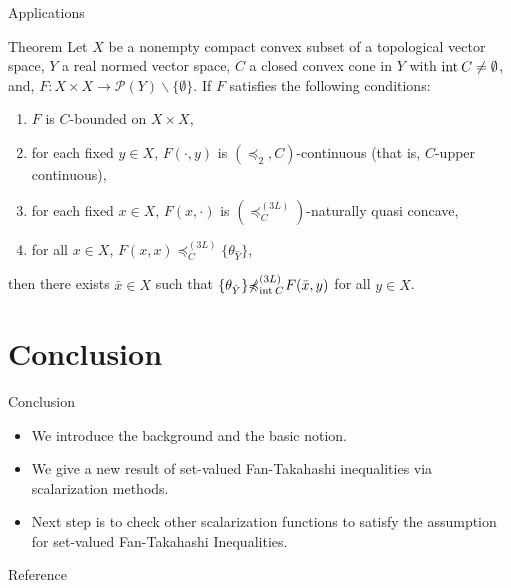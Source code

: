 \documentclass[aspectratio=169, dvipdfmx, 11pt]{beamer}
\newcommand{\Interior}[1]{\text{\rm int\:${#1}$}} %
\newcommand{\notsetrel}[2]{{\not\preccurlyeq}^{(#1)}_{#2}\!}
\begin{document}
\begin{frame}{Applications}
  \begin{block}{Theorem}
    Let $X$ be a nonempty compact convex subset of a topological vector space,
    $Y$ a real normed vector space, $C$ a closed convex cone in $Y$ with $\Interior{C} \ne \emptyset$,
    and, $F\colon X \times X \to \mathcal{P}(Y) \backslash \{\emptyset\}$.
    If $F$ satisfies the following conditions:
    \begin{enumerate}
      \item $F$ is $C$-bounded on $X \times X$,
      \item for each fixed $y \in X$, $F(\cdot,y)$ is $(\preccurlyeq_{2}, C)$-continuous (that is, $C$-upper continuous),
      \item for each fixed $x \in X$, $F(x,\cdot)$ is $(\preccurlyeq_{C}^{(3L)})$-naturally quasi concave,
      \item for all $x \in X$, $F(x,x) \preccurlyeq_{C}^{(3L)} \{\theta_{\hat{Y}}\}$,
    \end{enumerate}
    then there exists $\bar{x} \in X$ such that $\{\theta_{\hat{Y}}\} \notsetrel{3L}{\Interior{C}}\: F(\bar{x},y)$ for all $y \in X$.
  \end{block}
\end{frame}


\section{Conclusion}

\begin{frame}{Conclusion}
  \begin{itemize}
    \item We introduce the background and the basic notion.
    \item We give a new result of set-valued Fan-Takahashi inequalities via scalarization methods.
    \item Next step is to check other scalarization functions to satisfy the assumption 
    for set-valued Fan-Takahashi Inequalities.
  \end{itemize}
\end{frame}

\begin{frame}[allowframebreaks]{Reference}
  \printbibliography
\end{frame}
\end{document}
